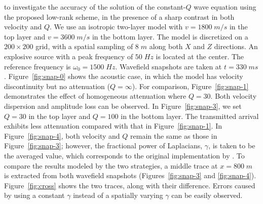  to investigate the accuracy of the solution of the constant-$Q$ wave equation using the proposed low-rank scheme, in the presence of a sharp contrast in both velocity and $Q$. We use an isotropic two-layer model with $v=1800\;m/s$ in the top layer and $v=3600\;m/s$ in the bottom layer. The model is discretized on a $200 \times 200$ grid, with a spatial sampling of $8\;m$ along both $X$ and $Z$ directions. An explosive source with a peak frequency of $50\;Hz$ is located at the center. The reference frequency is $\omega_0=1500\;Hz$. Wavefield snapshots are taken at $t=330\;ms$. Figure~\ref{fig:snap-0} shows the acoustic case, in which the model has velocity discontinuity but no attenuation ($Q=\infty$). For comparison, Figure~\ref{fig:snap-1} demonstrates the effect of homogeneous attenuation where $Q=30$. Both velocity dispersion and amplitude loss can be observed. In Figure~\ref{fig:snap-3}, we set $Q=30$ in the top layer and $Q=100$ in the bottom layer. The transmitted arrival exhibits less attenuation compared with that in Figure~\ref{fig:snap-1}. In Figure~\ref{fig:snap-4}, both velocity and $Q$ remain the same as those in Figure~\ref{fig:snap-3}; however, the fractional power of Laplacians, $\gamma$, is taken to be the averaged value, which corresponds to the original implementation by \cite{zhu14a}. To compare the results modeled by the two strategies, a middle trace at $x=800\;m$ is extracted from both wavefield snapshots (Figures~\ref{fig:snap-3} and \ref{fig:snap-4}). Figure~\ref{fig:cross} shows the two traces, along with their difference. Errors caused by using a constant $\gamma$ instead of a spatially varying $\gamma$ can be easily observed.



